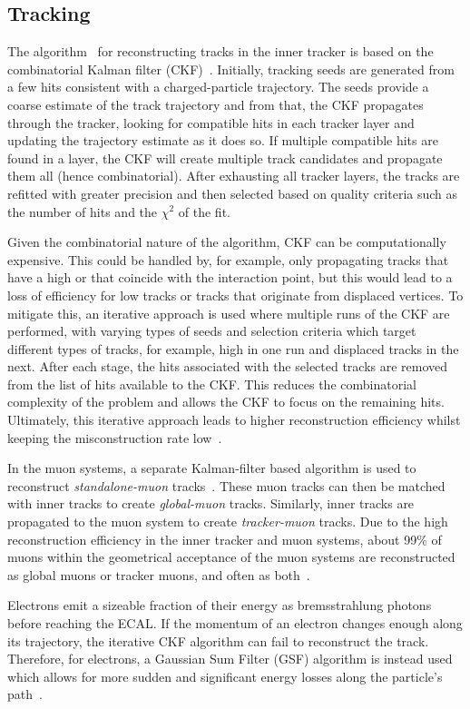 \subsection{Tracking}\label{sec:tracking}
The algorithm~\cite{Adam:2005cg,Cucciarelli:2006mt,CMS:2014pgm,Elmetenawee:2023xyl} for reconstructing tracks in the inner tracker is based on the combinatorial Kalman filter (CKF)~\cite{Fruhwirth:1987fm,Billoir:1989mh,Billoir:1990we,Mankel:1997dy}. Initially, tracking seeds are generated from a few hits consistent with a charged-particle trajectory. The seeds provide a coarse estimate of the track trajectory and from that, the CKF propagates through the tracker, looking for compatible hits in each tracker layer and updating the trajectory estimate as it does so. If multiple compatible hits are found in a layer, the CKF will create multiple track candidates and propagate them all (hence combinatorial). After exhausting all tracker layers, the tracks are refitted with greater precision and then selected based on quality criteria such as the number of hits and the $\chi^2$ of the fit. 

Given the combinatorial nature of the algorithm, CKF can be computationally expensive. This could be handled by, for example, only propagating tracks that have a high \pt or that coincide with the interaction point, but this would lead to a loss of efficiency for low \pt tracks or tracks that originate from displaced vertices. To mitigate this, an iterative approach is used where multiple runs of the CKF are performed, with varying types of seeds and selection criteria which target different types of tracks, for example, high \pt in one run and displaced tracks in the next. After each stage, the hits associated with the selected tracks are removed from the list of hits available to the CKF. This reduces the combinatorial complexity of the problem and allows the CKF to focus on the remaining hits. Ultimately, this iterative approach leads to higher reconstruction efficiency whilst keeping the misconstruction rate low~\cite{CMS:2017yfk}.

In the muon systems, a separate Kalman-filter based algorithm is used to reconstruct \textit{standalone-muon} tracks~\cite{CMS:2018rym}. These muon tracks can then be matched with inner tracks to create \textit{global-muon} tracks. Similarly, inner tracks are propagated to the muon system to create \textit{tracker-muon} tracks. Due to the high reconstruction efficiency in the inner tracker and muon systems, about 99\% of muons within the geometrical acceptance of the muon systems are reconstructed as global muons or tracker muons, and often as both~\cite{CMS:2017yfk}.

Electrons emit a sizeable fraction of their energy as bremsstrahlung photons before reaching the ECAL. If the momentum of an electron changes enough along its trajectory, the iterative CKF algorithm can fail to reconstruct the track. Therefore, for electrons, a Gaussian Sum Filter (GSF) algorithm is instead used which allows for more sudden and significant energy losses along the particle's path~\cite{Adam:2003kg}.